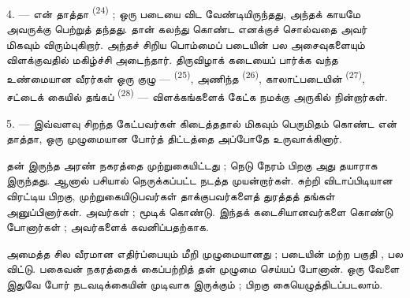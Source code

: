 \VUsaut{4.0mm}
\VUsaut{2.8mm}

4. --- என் தாத்தா  \textsuperscript{(24)} ; ஒரு
 படையை விட வேண்டியிருந்தது, அந்தக் காயமே அவருக்கு
 பெற்றுத் தந்தது. தான் கலந்து கொண்ட
 எனக்குச் சொல்வதை அவர் மிகவும்
விரும்புகிறார். அந்தச் சிறிய பொம்மைப் படையின் பல அசைவுகளையும்
விளக்குவதில் மகிழ்ச்சி அடைந்தார். திருவிழாக் கடையைப் பார்க்க வந்த
உண்மையான வீரர்கள் ஒரு குழு — 
\textsuperscript{(25)},  அணிந்த  \textsuperscript{(26)}, காலாட்படையின்
 \textsuperscript{(27)}, சட்டைக் கையில்
தங்கப்  
\textsuperscript{(28)} — விளக்கங்களைக் கேட்க நமக்கு அருகில்
நின்றார்கள்.

5. --- இவ்வளவு சிறந்த கேட்பவர்கள் கிடைத்ததால் மிகவும் பெருமிதம்
கொண்ட என் தாத்தா, ஒரு முழுமையான போர்த் திட்டத்தை அப்போதே
உருவாக்கினார்.

தன்   இருந்த அரண்
நகரத்தை  முற்றுகையிட்டது ; நெடு நேரம்
 பிறகு அது  தயாராக
இருந்தது. ஆனால் பசியால் நெருக்கப்பட்ட   
 நடத்த முயன்றார்கள்.  சுற்றி விடாப்பிடியான 
 விரட்டிய பிறகு, 
முற்றுகையிடுபவர்கள்  தாக்குபவர்களைத் துரத்தத் தங்கள்
 அனுப்பினார்கள். அவர்கள்
 ; 
 
மூடிக் கொண்டு.  இந்தக்
கடைசியானவர்களை  கொண்டு
போனார்கள் ;  அவர்களைக் கவனிப்பதற்காக.

 அமைத்த சில  வீரமான
எதிர்ப்பையும் மீறி  முழுமையானது ; படையின் மற்ற
பகுதி , பல  விட்டு.
பகைவன் நகரத்தைக் கைப்பற்றித் தன்  முழுமை
செய்யப் போனான். ஒரு வேளை இதுவே போர் நடவடிக்கையின் முடிவாக
இருக்கும் ;  பிறகு
 கையெழுத்திடப்படலாம்.

\VUsaut{4.4mm}
\VUsaut{2.8mm}

